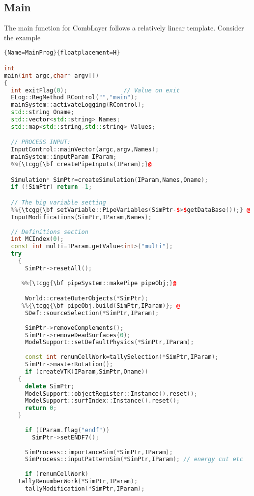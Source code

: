 \subsection{Main}

The main function for CombLayer follows a relatively linear template.
Consider the example

\begin{lstlisting}[language=C++]{Name=MainProg}{floatplacement=H}

int 
main(int argc,char* argv[])
{
  int exitFlag(0);                // Value on exit
  ELog::RegMethod RControl("","main");
  mainSystem::activateLogging(RControl);
  std::string Oname;
  std::vector<std::string> Names;  
  std::map<std::string,std::string> Values;  

  // PROCESS INPUT:
  InputControl::mainVector(argc,argv,Names);
  mainSystem::inputParam IParam;
  %%{\tcgg{\bf createPipeInputs(IParam);}@

  Simulation* SimPtr=createSimulation(IParam,Names,Oname);
  if (!SimPtr) return -1;

  // The big variable setting
  %%{\tcgg{\bf setVariable::PipeVariables(SimPtr-$>$getDataBase());} @
  InputModifications(SimPtr,IParam,Names);
  
  // Definitions section 
  int MCIndex(0);
  const int multi=IParam.getValue<int>("multi");
  try
    {
      SimPtr->resetAll();
      
     %%{\tcgg{\bf pipeSystem::makePipe pipeObj;}@

      World::createOuterObjects(*SimPtr);
     %%{\tcgg{\bf pipeObj.build(SimPtr,IParam)}; @  
      SDef::sourceSelection(*SimPtr,IParam);
      
      SimPtr->removeComplements();
      SimPtr->removeDeadSurfaces(0);         
      ModelSupport::setDefaultPhysics(*SimPtr,IParam);
      
      const int renumCellWork=tallySelection(*SimPtr,IParam);
      SimPtr->masterRotation();
      if (createVTK(IParam,SimPtr,Oname))
	{
	  delete SimPtr;
	  ModelSupport::objectRegister::Instance().reset();
	  ModelSupport::surfIndex::Instance().reset();
	  return 0;
	}
      
      if (IParam.flag("endf"))
        SimPtr->setENDF7();
      
      SimProcess::importanceSim(*SimPtr,IParam);
      SimProcess::inputPatternSim(*SimPtr,IParam); // energy cut etc
      
      if (renumCellWork)
	tallyRenumberWork(*SimPtr,IParam);
      tallyModification(*SimPtr,IParam);
      

\end{lstlisting}
